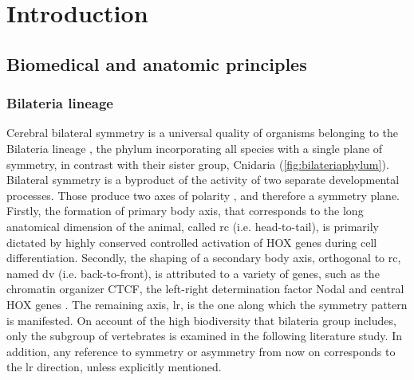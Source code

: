 \chapter{Introduction}
\label{chap:introduction}
\section{Biomedical and anatomic principles}
\subsection{Bilateria lineage}
Cerebral bilateral symmetry is a universal quality of organisms belonging to the Bilateria lineage \cite{Concha2012,Corballis2009}, the phylum incorporating all species with a single plane of symmetry, in contrast with their sister group, Cnidaria (\autoref{fig:bilateriaphylum}). Bilateral symmetry is a byproduct of the activity of two separate developmental processes. Those produce two axes of polarity \cite{Finnerty2003}, and therefore a symmetry plane. Firstly, the formation of primary body axis, that corresponds to the long anatomical dimension of the animal, called \acf{rc} (i.e. head-to-tail), is primarily dictated by highly conserved controlled activation of HOX genes during cell differentiation. Secondly, the shaping of a secondary body axis, orthogonal to \ac{rc}, named \acf{dv} (i.e. back-to-front), is attributed to a variety of genes,  such as the chromatin organizer CTCF, the left-right determination factor Nodal and central HOX genes \cite{Heger2020}. The remaining axis, \acf{lr}, is the one along which the symmetry pattern is manifested. On account of the high biodiversity that bilateria group includes, only the subgroup of vertebrates is examined in the following literature study. In addition, any reference to symmetry or asymmetry from now on corresponds to the \ac{lr} direction, unless explicitly mentioned.

